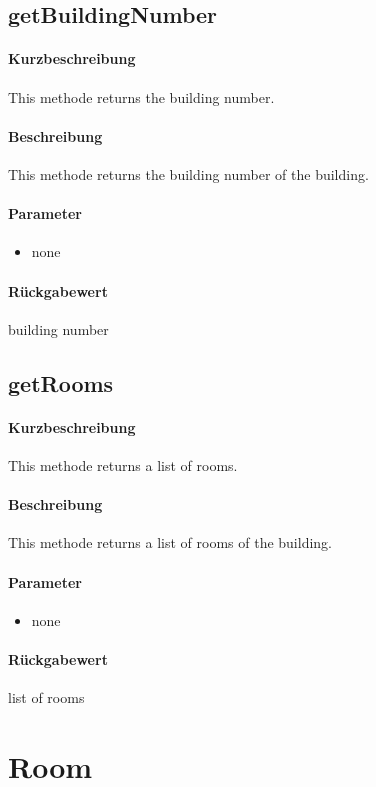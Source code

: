 \subsection{getBuildingNumber}%
\paragraph*{Kurzbeschreibung}
This methode returns the building number.
\paragraph*{Beschreibung}
This methode returns the building number of the building.
\paragraph*{Parameter}
\begin{itemize}
    \item none
\end{itemize}
\paragraph*{Rückgabewert}
building number

\subsection{getRooms}%
\paragraph*{Kurzbeschreibung}
This methode returns a list of rooms.
\paragraph*{Beschreibung}
This methode returns a list of rooms of the building.
\paragraph*{Parameter}
\begin{itemize}
    \item none
\end{itemize}
\paragraph*{Rückgabewert}
list of rooms


\section{Room}

